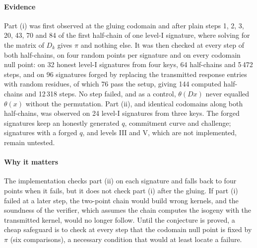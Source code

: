 {    \paragraph{Evidence}
    Part (i) was first observed at the gluing codomain and after plain steps
    1, 2, 3, 20, 43, 70 and 84 of the first half-chain of one level-I
    signature, where solving for the matrix of $D_k$ gives $\pi$ and nothing
    else. It was then checked at every step of both half-chains, on four
    random points per signature and on every codomain null point: on 32
    honest level-I signatures from four keys, 64 half-chains and 5\,472
    steps, and on 96 signatures forged by replacing the transmitted response
    entries with random residues, of which 76 pass the setup, giving 144
    computed half-chains and 12\,318 steps. No step failed, and as a control,
    $\theta(Dx)$ never equalled $\theta(x)$ without the permutation. Part
    (ii), and identical codomains along both half-chains, was observed on 24
    level-I signatures from three keys. The forged signatures keep an honestly
    generated $q$, commitment curve and challenge; signatures with a forged
    $q$, and levels III and V, which are not implemented, remain untested.

    \paragraph{Why it matters}
    The implementation checks part (ii) on each signature and falls back to
    four points when it fails, but it does not check part (i) after the
    gluing. If part (i) failed at a later step, the two-point chain would
    build wrong kernels, and the soundness of the verifier, which assumes the
    chain computes the isogeny with the transmitted kernel, would no longer
    follow. Until the conjecture is proved, a cheap safeguard is to check at
    every step that the codomain null point is fixed by $\pi$ (six
    comparisons), a necessary condition that would at least locate a
    failure.

}
